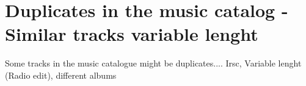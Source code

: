 \section{Duplicates in the music catalog - Similar tracks variable lenght}
\label{sub:duplicates}

Some tracks in the music catalogue might be duplicates.... Irsc, Variable lenght (Radio edit), different albums